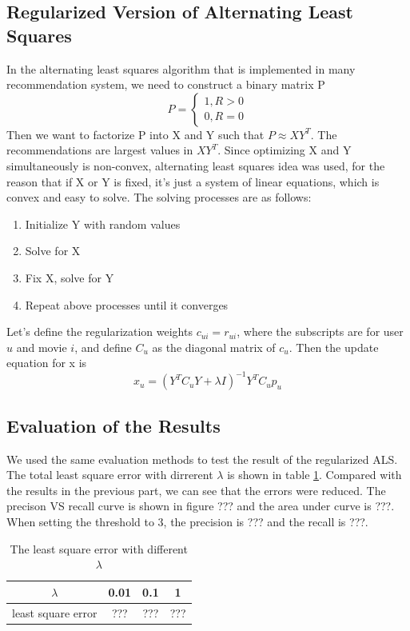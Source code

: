 \documentclass{article}
\begin{document}
\subsection{Regularized Version of Alternating Least Squares}
In the alternating least squares algorithm that is implemented in many recommendation system, we need to construct a binary matrix P
\begin{equation*}
P = \begin{cases}
				1, R > 0\\
				0, R = 0
		\end{cases}
\end{equation*}
Then we want to factorize P into X and Y such that $P \approx XY^T$. The recommendations are largest values in $XY^T$. Since optimizing X and Y simultaneously is non-convex, alternating least squares idea was used, for the reason that if X or Y is fixed, it's just a system of linear equations, which is convex and easy to solve. The solving processes are as follows:
\begin{enumerate}
\item Initialize Y with random values
\item Solve for X
\item Fix X, solve for Y
\item Repeat above processes until it converges
\end{enumerate}
Let's define the regularization weights $c_{ui} = r_{ui}$, where the subscripts are for user $u$ and movie $i$, and define $C_u$ as the diagonal matrix of $c_u$. Then the update equation for x is
\begin{equation*}
x_u = (Y^TC_uY+\lambda I)^{-1}Y^TC_up_u
\end{equation*}
\subsection{Evaluation of the Results}
We used the same evaluation methods to test the result of the regularized ALS. The total least square error with dirrerent $\lambda$ is shown in table \ref{tb:lamda}. Compared with the results in the previous part, we can see that the errors were reduced. The precison VS recall curve is shown in figure ??? and the area under curve is ???. When setting the threshold to 3, the precision is ??? and the recall is ???.
\begin{table}
\begin{center}
\caption{The least square error with different $\lambda$}
\label{tb:lamda}
\begin{tabular}{|c|c|c|c|}
\hline
$\lambda$& 0.01& 0.1 & 1\\
\hline
least square error&???&???&???\\
\hline
\end{tabular}
\end{center}
\end{table}
\end{document}
